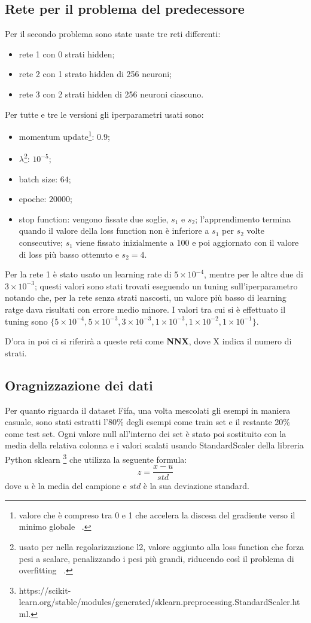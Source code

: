 \documentclass[12pt]{report}
\begin{document}
\subsection{Rete per il problema del predecessore}\label{reteAdHoc}
Per il secondo problema sono state usate tre reti differenti:
\begin{itemize}
\item{rete 1 con 0 strati hidden};
\item{rete 2 con 1 strato hidden di 256 neuroni};
\item{rete 3 con 2 strati hidden di 256 neuroni ciascuno}.
\end{itemize}

Per tutte e tre le versioni gli iperparametri usati sono:
\begin{itemize}
\item{momentum update}\footnote{valore che è compreso tra 0 e 1 che accelera la discesa del gradiente verso il minimo globale ~\cite{Momentum}.}: $0.9$;
\item{$\lambda$}\footnote{usato per nella regolarizzazione l2, valore aggiunto alla loss function che forza pesi a scalare, penalizzando i pesi più grandi, riducendo così il problema di overfitting ~\cite{L2}.}: $10^{-5}$;
\item{batch size}: $64$;
\item{epoche}: $20000$;
\item{stop function}: vengono fissate due soglie, $s_1$ e $s_2$; l'apprendimento termina quando il valore della loss function non è inferiore a $s_1$ per $s_2$ volte consecutive; $s_1$ viene fissato inizialmente a 100 e poi aggiornato con il valore di loss più basso ottenuto e $s_2 = 4$.
\end{itemize}
Per la rete 1 è stato usato un learning rate di $5 \times 10^{-4}$, mentre per le altre due di $3 \times 10^{-3}$; questi valori sono stati trovati eseguendo un tuning sull'iperparametro notando che, per la rete senza strati nascosti, un valore più basso di learning ratge dava risultati con errore medio minore. I valori tra cui si è effettuato il tuning sono $\{5 \times 10^{-4}, 5 \times 10^{-3}, 3 \times 10^{-3}, 1 \times 10^{-3}, 1 \times 10^{-2}, 1 \times 10^{-1}\}$.

D'ora in poi ci si riferirà a queste reti come \textbf{NNX}, dove X indica il numero di strati.

\subsection{Oragnizzazione dei dati}
Per quanto riguarda il dataset Fifa, una volta mescolati gli esempi in maniera casuale, sono stati estratti l'80\% degli esempi come train set e il restante 20\% come test set. Ogni valore null all’interno dei set è stato poi sostituito con la media della relativa colonna e i valori scalati usando StandardScaler della libreria Python sklearn \footnote{https://scikit-learn.org/stable/modules/generated/sklearn.preprocessing.StandardScaler.html.} che utilizza la seguente formula:
\begin{equation}
z = \frac{x - u}{std}
\label{standardscaler}
\end{equation}
dove $u$ è la media del campione e $std$ è la sua deviazione standard.
\end{document}
